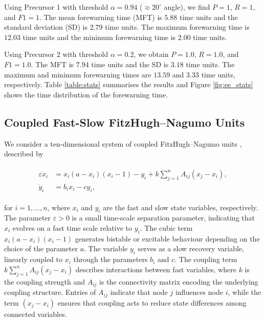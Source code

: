 \documentclass[aps,reprint,prx]{revtex4-2}
\begin{document}
{Using Precursor 1 with threshold $\alpha=0.94$ ($\approx20^\circ$ angle), we find $P = 1$, $R = 1$, and $F1 = 1$. The mean forewarning time (MFT) is $5.88$ time units and the standard deviation (SD) is $2.79$ time units. The maximum forewarning time is $12.03$ time units and the minimum forewarning time is $2.00$ time units.}

{Using Precursor 2 with threshold $\alpha = 0.2$, we obtain $P = 1.0$, $R = 1.0$, and $F1 = 1.0$. The MFT is $7.94$ time units and the SD is $3.18$ time units. The maximum and minimum forewarning times are $13.59$ and $3.33$ time units, respectively. Table \ref{table:stats} summarises the results and Figure \ref{fig:ee_stats} shows the time distribution of the forewarning time.}

\subsection{Coupled Fast-Slow FitzHugh--Nagumo Units}\label{sec:fhn}
We consider a ten-dimensional system of coupled FitzHugh--Nagumo units \cite{ansmannExtremeEventsExcitable2013}, described by

\begin{align}
\label{eq:fhn10}
    \begin{aligned}
        \varepsilon\dot{x}_i &= x_i (a - x_i)(x_i - 1) - y_i + k \sum_{j=1}^{n} A_{ij} (x_j - x_i), \\
        \dot{y}_i &= b_i x_i - c y_i,
    \end{aligned}
\end{align}

for $i = 1,...,n$, where \( x_i \) and \( y_i \) are the fast and slow state variables, respectively. The parameter \( \varepsilon > 0 \) is a small time-scale separation parameter, indicating that \( x_i \) evolves on a fast time scale relative to \( y_i \). The cubic term \( x_i(a - x_i)(x_i - 1) \) generates bistable or excitable behaviour depending on the choice of the parameter \( a \). The variable \( y_i \) serves as a slow recovery variable, linearly coupled to \( x_i \) through the parameters \( b_i \) and \( c \).
%
The coupling term \( k \sum_{j=1}^{n} A_{ij}(x_j - x_i) \) describes interactions between fast variables, where \( k \) is the coupling strength and \( A_{ij} \) is the connectivity matrix encoding the underlying coupling structure. Entries of \( A_{ij} \) indicate that node \( j \) influences node \( i \), while the term \( (x_j - x_i) \) ensures that coupling acts to reduce state differences among connected variables.
\end{document}
